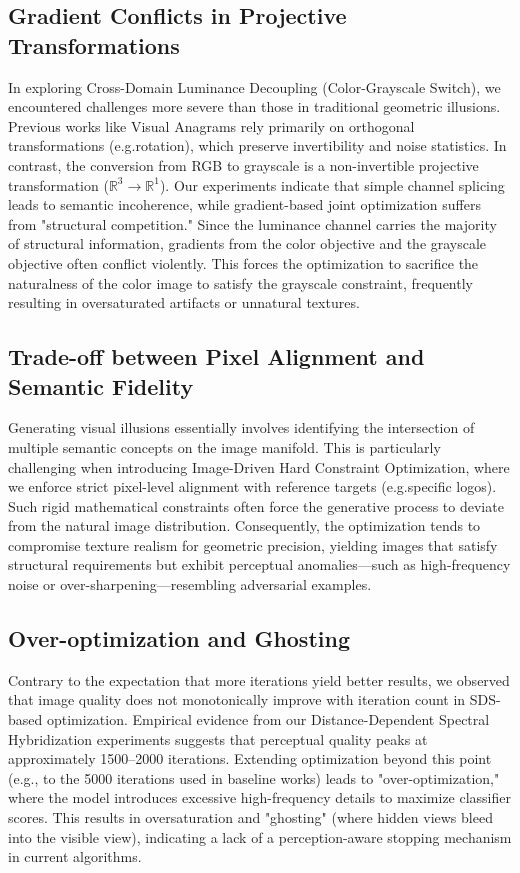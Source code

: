 \documentclass{article}
\begin{document}
\subsection{Gradient Conflicts in Projective Transformations}

In exploring Cross-Domain Luminance Decoupling (Color-Grayscale Switch), we encountered challenges more severe than those in traditional geometric illusions. Previous works like Visual Anagrams\cite{geng2024visual} rely primarily on orthogonal transformations (e.g.rotation), which preserve invertibility and noise statistics. In contrast, the conversion from RGB to grayscale is a non-invertible projective transformation ($\mathbb{R}^3 \to \mathbb{R}^1$). Our experiments indicate that simple channel splicing leads to semantic incoherence, while gradient-based joint optimization suffers from "structural competition." Since the luminance channel carries the majority of structural information, gradients from the color objective and the grayscale objective often conflict violently. This forces the optimization to sacrifice the naturalness of the color image to satisfy the grayscale constraint, frequently resulting in oversaturated artifacts or unnatural textures.

\subsection{Trade-off between Pixel Alignment and Semantic Fidelity}

Generating visual illusions essentially involves identifying the intersection of multiple semantic concepts on the image manifold. This is particularly challenging when introducing Image-Driven Hard Constraint Optimization, where we enforce strict pixel-level alignment with reference targets (e.g.specific logos). Such rigid mathematical constraints often force the generative process to deviate from the natural image distribution. Consequently, the optimization tends to compromise texture realism for geometric precision, yielding images that satisfy structural requirements but exhibit perceptual anomalies—such as high-frequency noise or over-sharpening—resembling adversarial examples.

\subsection{Over-optimization and Ghosting}

Contrary to the expectation that more iterations yield better results, we observed that image quality does not monotonically improve with iteration count in SDS-based optimization. Empirical evidence from our Distance-Dependent Spectral Hybridization experiments suggests that perceptual quality peaks at approximately 1500–2000 iterations. Extending optimization beyond this point (e.g., to the 5000 iterations used in baseline works) leads to "over-optimization," where the model introduces excessive high-frequency details to maximize classifier scores. This results in oversaturation and "ghosting" (where hidden views bleed into the visible view), indicating a lack of a perception-aware stopping mechanism in current algorithms.
\end{document}
